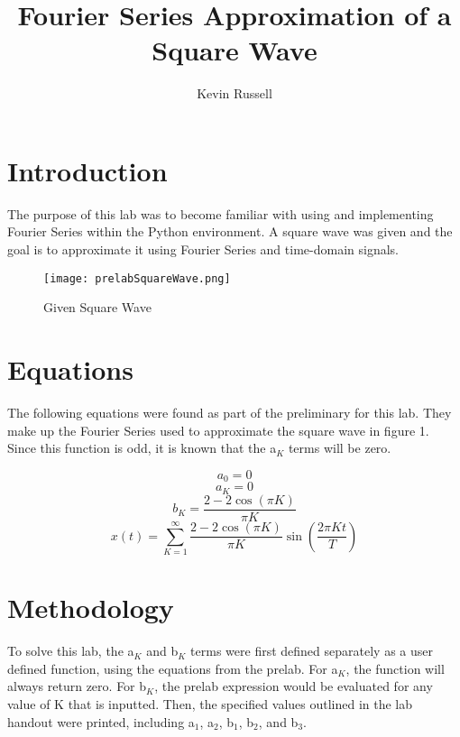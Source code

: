 \documentclass[12pt, titlepage]{article}
\author{Kevin Russell}
\title{Fourier Series Approximation of a Square Wave}
\date{\parbox{\linewidth}{\centering%
  \experimentDate
  \endgraf\bigskip
  \className\ -- Section \sectionNumber\
}}
\begin{document}
 \newpage
	    \maketitle
\newpage
    \tableofcontents
    
\newpage
    \section{Introduction}    
    The purpose of this lab was to become familiar with using and implementing Fourier Series within the Python environment.  A square wave was given and the goal is to approximate it using Fourier Series and time-domain signals.
    \begin{figure}[h!]
        \centering
        \texttt{[image: prelabSquareWave.png]}
        \caption{Given Square Wave}
        \label{fig:my_label}
    \end{figure}
    
    \section{Equations}
    The following equations were found as part of the preliminary for this lab.  They make up the Fourier Series used to approximate the square wave in figure 1.  Since this function is odd, it is known that the a$_K$ terms will be zero.
    
     \begin{equation}
           a_0=0
           \nonumber
       \end{equation}
       \begin{equation}
           a_K=0
           \nonumber
       \end{equation}
       \begin{equation}
           b_K=\frac{2-2\cos{(\pi K)}}{\pi K}
           \nonumber
       \end{equation}
       \begin{equation}
           x(t)=\sum_{K=1}^{\infty}\frac{2-2\cos{(\pi K)}}{\pi K}\sin{(\frac{2\pi Kt}{T})}
       \end{equation}
    
    \section{Methodology}
   To solve this lab, the a$_K$ and b$_K$ terms were first defined separately as a user defined function, using the equations from the prelab.  For a$_K$, the function will always return zero. For b$_K$, the prelab expression would be evaluated for any value of K that is inputted. Then, the specified values outlined in the lab handout were printed, including a$_1$, a$_2$, b$_1$, b$_2$, and b$_3$.
   
\end{document}
